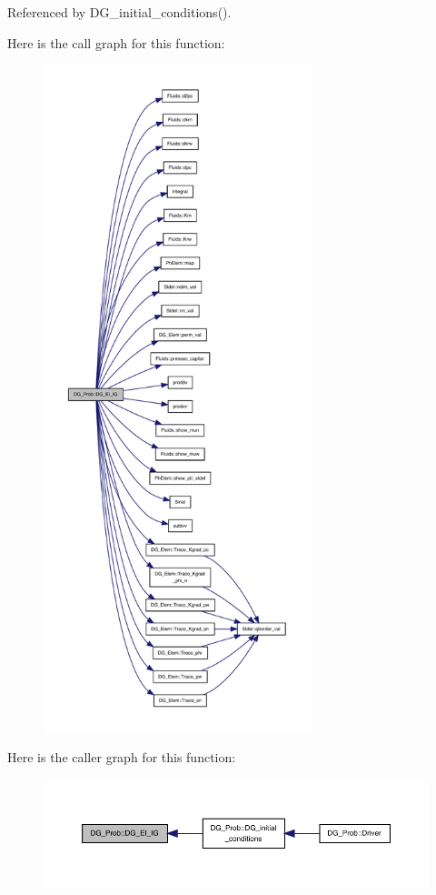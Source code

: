 Referenced by D\+G\+\_\+initial\+\_\+conditions().

Here is the call graph for this function\+:
\nopagebreak
\begin{figure}[H]
\begin{center}
\leavevmode
\includegraphics[height=550pt]{classDG__Prob_a0096cd2affdd37f2f3d0e7bc807a7b4b_cgraph}
\end{center}
\end{figure}
Here is the caller graph for this function\+:
\nopagebreak
\begin{figure}[H]
\begin{center}
\leavevmode
\includegraphics[width=350pt]{classDG__Prob_a0096cd2affdd37f2f3d0e7bc807a7b4b_icgraph}
\end{center}
\end{figure}
\mbox{\label{classDG__Prob_a6e6d838559f53cff2a917c3e9a5111ba}} 

